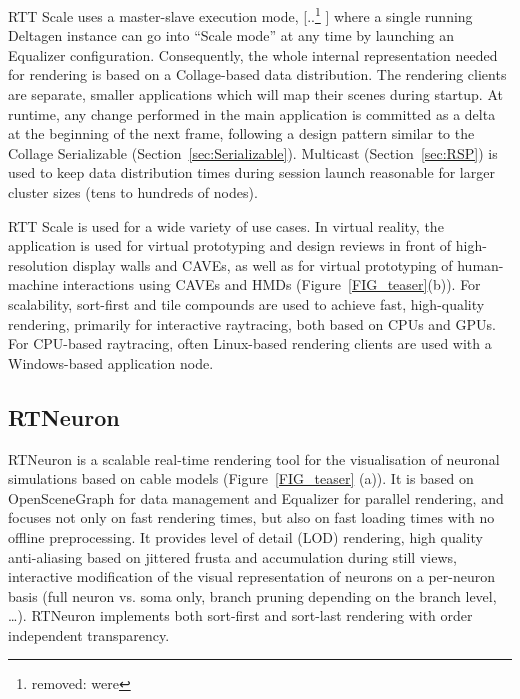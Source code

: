 \documentclass[10pt,journal,compsoc]{IEEEtran}
\newcommand{\sref}[1]{Section~\ref{#1}}
\newcommand{\fig}[1]{Figure~\ref{#1}}
\providecommand{\DIFaddtex}[1]{{\protect\color{blue} \sf #1}} %
\providecommand{\DIFdeltex}[1]{{\protect\color{red} [..\footnote{removed: #1} ]}} %
\providecommand{\DIFaddbegin}{} %
\providecommand{\DIFaddend}{} %
\providecommand{\DIFdelbegin}{} %
\providecommand{\DIFdelend}{} %
\providecommand{\DIFadd}[1]{\texorpdfstring{\DIFaddtex{#1}}{#1}} %
\providecommand{\DIFdel}[1]{\texorpdfstring{\DIFdeltex{#1}}{}} %
\newcommand{\DIFscaledelfig}{0.5}
\newlength{\DIFdelgraphicswidth} %
\newlength{\DIFdelgraphicsheight} %
\newcommand{\DIFaddincludegraphics}[2][]{{\color{blue}\fbox{\DIFOincludegraphics[#1]{#2}}}} %
\newcommand{\DIFdelincludegraphics}[2][]{%
\sbox{\DIFdelgraphicsbox}{\DIFOincludegraphics[#1]{#2}}%
\settoboxwidth{\DIFdelgraphicswidth}{\DIFdelgraphicsbox} %
\settoboxtotalheight{\DIFdelgraphicsheight}{\DIFdelgraphicsbox} %
\scalebox{\DIFscaledelfig}{%
\parbox[b]{\DIFdelgraphicswidth}{\usebox{\DIFdelgraphicsbox}\\[-\baselineskip] \rule{\DIFdelgraphicswidth}{0em}}\llap{\resizebox{\DIFdelgraphicswidth}{\DIFdelgraphicsheight}{%
\setlength{\unitlength}{\DIFdelgraphicswidth}%
\begin{picture}(1,1)%
\thicklines\linethickness{2pt} %
{\color[rgb]{1,0,0}\put(0,0){\framebox(1,1){}}}%
{\color[rgb]{1,0,0}\put(0,0){\line( 1,1){1}}}%
{\color[rgb]{1,0,0}\put(0,1){\line(1,-1){1}}}%
\end{picture}%
}\hspace*{3pt}}} %
} %
\DeclareRobustCommand{\DIFaddbegin}{\DIFOaddbegin \let\includegraphics\DIFaddincludegraphics} %
\DeclareRobustCommand{\DIFaddend}{\DIFOaddend \let\includegraphics\DIFOincludegraphics} %
\DeclareRobustCommand{\DIFdelbegin}{\DIFOdelbegin \let\includegraphics\DIFdelincludegraphics} %
\DeclareRobustCommand{\DIFdelend}{\DIFOaddend \let\includegraphics\DIFOincludegraphics} %
\begin{document}
RTT Scale uses a master-slave execution mode, \DIFdelbegin \DIFdel{were }\DIFdelend \DIFaddbegin \DIFadd{where }\DIFaddend a single running Deltagen
instance can go into ``Scale mode'' at any time by launching an
\textsf{Equalizer} configuration. Consequently, the whole internal
representation needed for rendering is based on a \textsf{Collage}-based data
distribution. The rendering clients are separate, smaller applications which
will map their scenes during startup. At runtime, any change performed in the
main application is committed as a delta at the beginning of the next frame,
following a design pattern similar to the \textsf{Collage Serializable}
(\sref{sec:Serializable}). Multicast (\sref{sec:RSP}) is used to keep data
distribution times during session launch reasonable for larger cluster sizes
(tens to hundreds of nodes).

RTT Scale is used for a wide variety of use cases. In virtual reality, the
application is used for virtual prototyping and design reviews in front of
high-resolution display walls and CAVEs, as well as for virtual prototyping of
human-machine interactions using CAVEs and HMDs (\fig{FIG_teaser}(b)). For
scalability, sort-first and tile compounds are used to achieve fast,
high-quality rendering, primarily for interactive raytracing, both based on CPUs
and GPUs. For CPU-based raytracing, often Linux-based rendering clients are used
with a Windows-based application node.

\subsection{RTNeuron}

RTNeuron \cite{HBBES:13} is a scalable real-time rendering tool for the
visualisation of neuronal simulations based on cable models \DIFaddbegin \DIFadd{(\fig{FIG_teaser}
(a))}\DIFaddend . It is based on OpenSceneGraph for data management and Equalizer for
parallel rendering, and focuses not only on fast rendering times, but also on
fast loading times with no offline preprocessing. It provides level of detail
(LOD) rendering, high quality anti-aliasing based on jittered frusta and
accumulation during still views, interactive modification of the visual
representation of neurons on a per-neuron basis (full neuron vs. soma only,
branch pruning depending on the branch level, \dots). RTNeuron implements both
sort-first and sort-last rendering with order independent transparency.
\end{document}
